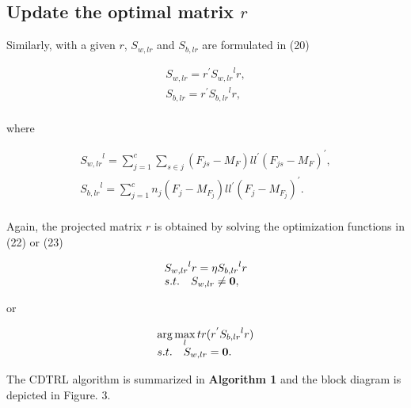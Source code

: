 \documentclass[journal]{IEEEtran}
\begin{document}
\subsection{Update the optimal matrix $r$}
Similarly, with a given $r$, $S_{w, lr}$ and $S_{b, lr}$ are formulated in (20)
\begin{small}
\begin{equation}
\begin{array}{l}
 {S_{w, lr}} = {r^{'}}{S_{w, lr}}^lr, \\
 {S_{b, lr}} = {r^{'}}{S_{b, lr}}^lr, \\
 \end{array}
\end{equation}
\end{small}
where
\begin{small}
\begin{equation}
\begin{array}{l}
 {S_{w, lr}}^l = \sum\limits_{j = 1}^c {\sum\limits_{s \in j}{({F_{js}} - {M_F})l{l^{'}}{{({F_{js}} - {M_F})}^{'}}} },  \\
 {S_{b, lr}}^l = \sum\limits_{j = 1}^c {{n_j}({F_j} - {M_{{F_j}}})l{l^{'}}{{({F_j} - {M_{{F_j}}})}^{'}}}.  \\
 \end{array}
\end{equation}
\end{small}
Again, the projected matrix $r$ is obtained by solving the optimization functions in (22) or (23)
\begin{small}
\begin{equation}
\begin{array}{l}
{S_{w,lr}}^lr = \eta {S_{b,lr}}^lr\\
s.t.\quad{\rm{ }}{S_{w,lr}} \ne {\bf{0}}, \\
\end{array}
\end{equation}
\end{small}
or
\begin{small}
\begin{equation}
\begin{array}{l}
\arg \mathop {\max }\limits_l tr({r^{'}}{S_{b,lr}}^lr)\\
s.t.\quad{\rm{ }}{S_{w,lr}} = {\bf{0}}. \\
\end{array}
\end{equation}
\end{small}
The CDTRL algorithm is summarized in \textbf{Algorithm 1} and the block diagram is depicted in Figure. 3.
\end{document}
